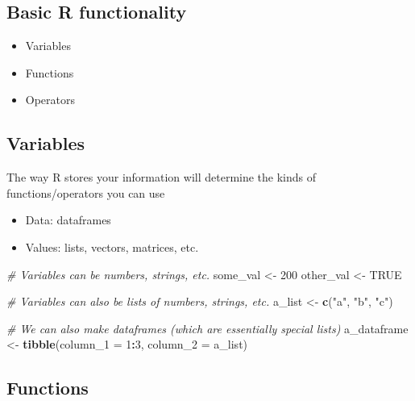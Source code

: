 \documentclass[
]{book}
\newenvironment{Shaded}{\begin{snugshade}}{\end{snugshade}}
\newcommand{\CommentTok}[1]{\textcolor[rgb]{0.56,0.35,0.01}{\textit{#1}}}
\newcommand{\DataTypeTok}[1]{\textcolor[rgb]{0.13,0.29,0.53}{#1}}
\newcommand{\DecValTok}[1]{\textcolor[rgb]{0.00,0.00,0.81}{#1}}
\newcommand{\KeywordTok}[1]{\textcolor[rgb]{0.13,0.29,0.53}{\textbf{#1}}}
\newcommand{\NormalTok}[1]{#1}
\newcommand{\OperatorTok}[1]{\textcolor[rgb]{0.81,0.36,0.00}{\textbf{#1}}}
\newcommand{\OtherTok}[1]{\textcolor[rgb]{0.56,0.35,0.01}{#1}}
\newcommand{\StringTok}[1]{\textcolor[rgb]{0.31,0.60,0.02}{#1}}
\providecommand{\tightlist}{%
  \setlength{\itemsep}{0pt}\setlength{\parskip}{0pt}}
\begin{document}
\hypertarget{basic-r-functionality}{%
\subsection{Basic R functionality}\label{basic-r-functionality}}

\begin{itemize}
\tightlist
\item
  Variables
\item
  Functions
\item
  Operators
\end{itemize}

\hypertarget{variables}{%
\subsection{Variables}\label{variables}}

The way R stores your information will determine the kinds of functions/operators you can use

\begin{itemize}
\tightlist
\item
  Data: dataframes
\item
  Values: lists, vectors, matrices, etc.
\end{itemize}

\begin{Shaded}
\begin{Highlighting}[]
\CommentTok{# Variables can be numbers, strings, etc.}
\NormalTok{some_val <-}\StringTok{ }\DecValTok{200}
\NormalTok{other_val <-}\StringTok{ }\OtherTok{TRUE}

\CommentTok{# Variables can also be lists of numbers, strings, etc.}
\NormalTok{a_list <-}\StringTok{ }\KeywordTok{c}\NormalTok{(}\StringTok{"a"}\NormalTok{, }\StringTok{"b"}\NormalTok{, }\StringTok{"c"}\NormalTok{)}

\CommentTok{# We can also make dataframes (which are essentially special lists)}
\NormalTok{a_dataframe <-}\StringTok{ }\KeywordTok{tibble}\NormalTok{(}\DataTypeTok{column_1 =} \DecValTok{1}\OperatorTok{:}\DecValTok{3}\NormalTok{,}
                      \DataTypeTok{column_2 =}\NormalTok{ a_list)}
\end{Highlighting}
\end{Shaded}

\hypertarget{functions}{%
\subsection{Functions}\label{functions}}
\end{document}
